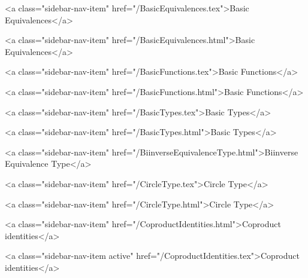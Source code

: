      
    
      
        
          <a class="sidebar-nav-item" href="/BasicEquivalences.tex">Basic Equivalences</a>
        
      
    
      
        
          <a class="sidebar-nav-item" href="/BasicEquivalences.html">Basic Equivalences</a>
        
      
    
      
        
          <a class="sidebar-nav-item" href="/BasicFunctions.tex">Basic Functions</a>
        
      
    
      
        
          <a class="sidebar-nav-item" href="/BasicFunctions.html">Basic Functions</a>
        
      
    
      
        
          <a class="sidebar-nav-item" href="/BasicTypes.tex">Basic Types</a>
        
      
    
      
        
          <a class="sidebar-nav-item" href="/BasicTypes.html">Basic Types</a>
        
      
    
      
        
          <a class="sidebar-nav-item" href="/BiinverseEquivalenceType.html">Biinverse Equivalence Type</a>
        
      
    
      
        
          <a class="sidebar-nav-item" href="/CircleType.tex">Circle Type</a>
        
      
    
      
        
          <a class="sidebar-nav-item" href="/CircleType.html">Circle Type</a>
        
      
    
      
        
          <a class="sidebar-nav-item" href="/CoproductIdentities.html">Coproduct identities</a>
        
      
    
      
        
          <a class="sidebar-nav-item active" href="/CoproductIdentities.tex">Coproduct identities</a>
        
